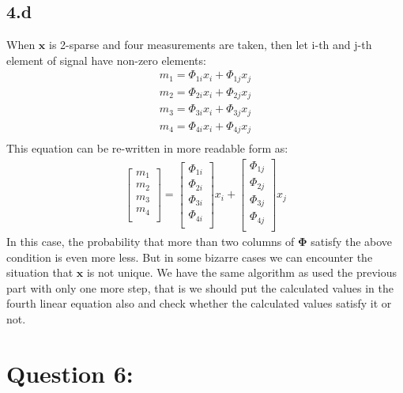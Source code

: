 \documentclass[12pt]{article}
\begin{document}
\subsection*{4.d}
When $\boldsymbol{x}$ is 2-sparse and four measurements are taken, then let i-th and j-th element of signal have non-zero elements:
\begin{align*}
    m_1 = \Phi_{1i}x_i+\Phi_{1j}x_j\\
    m_2 = \Phi_{2i}x_i+\Phi_{2j}x_j\\
    m_3 = \Phi_{3i}x_i+\Phi_{3j}x_j\\
    m_4 = \Phi_{4i}x_i+\Phi_{4j}x_j\\
\end{align*}
This equation can be re-written in more readable form as:
\begin{align*}
    \begin{bmatrix} 
    m_1 \\
    m_2 \\
    m_3 \\
    m_4 \\
    \end{bmatrix} =
    \begin{bmatrix} 
    \Phi_{1i} \\
    \Phi_{2i} \\
    \Phi_{3i} \\
    \Phi_{4i} \\
    \end{bmatrix}x_i +
    \begin{bmatrix} 
    \Phi_{1j} \\
    \Phi_{2j} \\
    \Phi_{3j} \\
    \Phi_{4j} \\
    \end{bmatrix}x_j
\end{align*}
In this case, the probability that more than two columns of $\boldsymbol{\Phi}$ satisfy the above condition is even more less. But in some bizarre cases we can encounter the situation that $\boldsymbol{x}$ is not unique. We have the same algorithm as used the previous part with only one more step, that is we should put the calculated values in the fourth linear equation also and check whether the calculated values satisfy it or not.

\section*{Question 6:}
\end{document}
